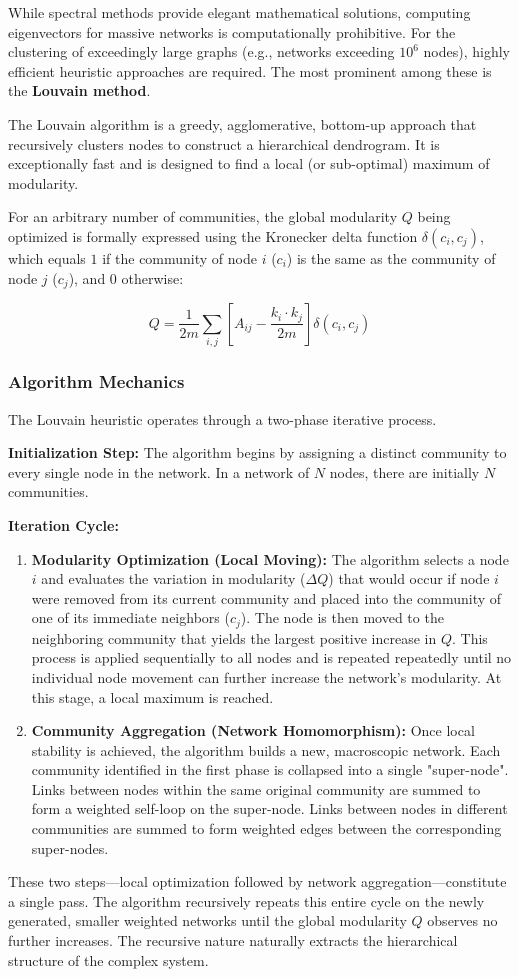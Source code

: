 While spectral methods provide elegant mathematical solutions, computing eigenvectors for massive networks is computationally prohibitive. For the clustering of exceedingly large graphs (e.g., networks exceeding $10^6$ nodes), highly efficient heuristic approaches are required. The most prominent among these is the \textbf{Louvain method}.

The Louvain algorithm is a greedy, agglomerative, bottom-up approach that recursively clusters nodes to construct a hierarchical dendrogram. It is exceptionally fast and is designed to find a local (or sub-optimal) maximum of modularity.

For an arbitrary number of communities, the global modularity $Q$ being optimized is formally expressed using the Kronecker delta function $\delta(c_i, c_j)$, which equals $1$ if the community of node $i$ ($c_i$) is the same as the community of node $j$ ($c_j$), and $0$ otherwise:

$$Q = \frac{1}{2m} \sum_{i,j} \left[ A_{ij} - \frac{k_i \cdot k_j}{2m} \right] \delta(c_i, c_j)$$

\subsubsection{Algorithm Mechanics}

The Louvain heuristic operates through a two-phase iterative process.

\textbf{Initialization Step:} The algorithm begins by assigning a distinct community to every single node in the network. In a network of $N$ nodes, there are initially $N$ communities.

\textbf{Iteration Cycle:}
\begin{enumerate}
    \item \textbf{Modularity Optimization (Local Moving):} The algorithm selects a node $i$ and evaluates the variation in modularity ($\Delta Q$) that would occur if node $i$ were removed from its current community and placed into the community of one of its immediate neighbors ($c_j$). The node is then moved to the neighboring community that yields the largest positive increase in $Q$. This process is applied sequentially to all nodes and is repeated repeatedly until no individual node movement can further increase the network's modularity. At this stage, a local maximum is reached.
    \item \textbf{Community Aggregation (Network Homomorphism):} Once local stability is achieved, the algorithm builds a new, macroscopic network. Each community identified in the first phase is collapsed into a single "super-node". Links between nodes within the same original community are summed to form a weighted self-loop on the super-node. Links between nodes in different communities are summed to form weighted edges between the corresponding super-nodes.
\end{enumerate}

These two steps—local optimization followed by network aggregation—constitute a single pass. The algorithm recursively repeats this entire cycle on the newly generated, smaller weighted networks until the global modularity $Q$ observes no further increases. The recursive nature naturally extracts the hierarchical structure of the complex system.